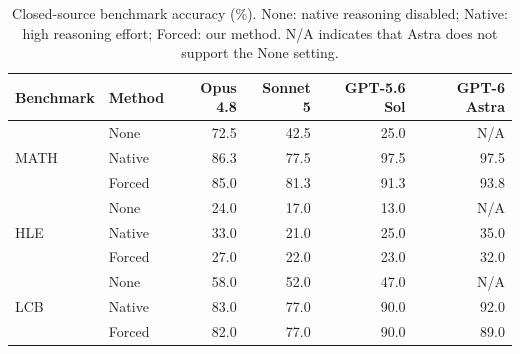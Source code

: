 \begin{table}[t]
\centering
\caption{Closed-source benchmark accuracy (\%).
None: native reasoning disabled; Native: high reasoning effort; Forced: our method.
N/A indicates that Astra does not support the None setting.}
\label{tab:closed-accuracy}
\small
\setlength{\tabcolsep}{5pt}
\begin{tabular}{llrrrr}
\toprule
Benchmark & Method & Opus 4.8 & Sonnet 5 & GPT-5.6 Sol & GPT-6 Astra \\
\midrule
\multirow{3}{*}{MATH} & None & 72.5 & 42.5 & 25.0 & N/A \\
& Native & 86.3 & 77.5 & 97.5 & 97.5 \\
& Forced & 85.0 & 81.3 & 91.3 & 93.8 \\
\midrule
\multirow{3}{*}{HLE} & None & 24.0 & 17.0 & 13.0 & N/A \\
& Native & 33.0 & 21.0 & 25.0 & 35.0 \\
& Forced & 27.0 & 22.0 & 23.0 & 32.0 \\
\midrule
\multirow{3}{*}{LCB} & None & 58.0 & 52.0 & 47.0 & N/A \\
& Native & 83.0 & 77.0 & 90.0 & 92.0 \\
& Forced & 82.0 & 77.0 & 90.0 & 89.0 \\
\bottomrule
\end{tabular}
\end{table}
